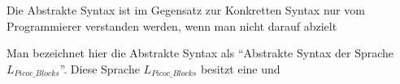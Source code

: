 \begin{grammar}
  \toprule
  \commentsecond*
  \midrule
  \arith*
  \midrule
  \logic*
  \midrule
  \assign*
  \midrule
  \pntrshrinkafter*
  \midrule
  \arraysecond*
  \midrule
  \struct*
  \midrule
  \ifelseblocks*
  \midrule
  \loopblocks*
  \midrule
  \funafter*
  \midrule
  \block
  \midrule
  \file*
  \bottomrule
\end{grammar}

\begin{Special_Paragraph}
  Die Abstrakte Syntax ist im Gegensatz zur Konkretten Syntax nur vom Programmierer verstanden werden, wenn man nicht darauf abzielt




  Man bezeichnet hier die Abstrakte Syntax als \enquote{Abstrakte Syntax der Sprache $L_{Picoc\_Blocks}$}. Diese Sprache $L_{Picoc\_Blocks}$ besitzt eine  und
\end{Special_Paragraph}



